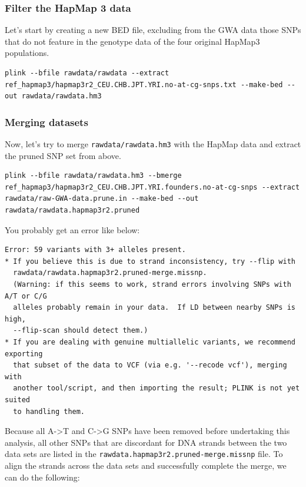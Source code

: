\documentclass[
]{book}
\newcommand{\passthrough}[1]{#1}
\begin{document}
\hypertarget{filter-the-hapmap-3-data}{%
\subsubsection{Filter the HapMap 3 data}\label{filter-the-hapmap-3-data}}

Let's start by creating a new BED file, excluding from the GWA data those SNPs that do not feature in the genotype data of the four original HapMap3 populations.

\begin{lstlisting}
plink --bfile rawdata/rawdata --extract ref_hapmap3/hapmap3r2_CEU.CHB.JPT.YRI.no-at-cg-snps.txt --make-bed --out rawdata/rawdata.hm3
\end{lstlisting}

\hypertarget{merging-datasets}{%
\subsubsection{Merging datasets}\label{merging-datasets}}

Now, let's try to merge \passthrough{\lstinline!rawdata/rawdata.hm3!} with the HapMap data and extract the pruned SNP set from above.

\begin{lstlisting}
plink --bfile rawdata/rawdata.hm3 --bmerge ref_hapmap3/hapmap3r2_CEU.CHB.JPT.YRI.founders.no-at-cg-snps --extract rawdata/raw-GWA-data.prune.in --make-bed --out rawdata/rawdata.hapmap3r2.pruned
\end{lstlisting}

You probably get an error like below:

\begin{lstlisting}
Error: 59 variants with 3+ alleles present.
* If you believe this is due to strand inconsistency, try --flip with
  rawdata/rawdata.hapmap3r2.pruned-merge.missnp.
  (Warning: if this seems to work, strand errors involving SNPs with A/T or C/G
  alleles probably remain in your data.  If LD between nearby SNPs is high,
  --flip-scan should detect them.)
* If you are dealing with genuine multiallelic variants, we recommend exporting
  that subset of the data to VCF (via e.g. '--recode vcf'), merging with
  another tool/script, and then importing the result; PLINK is not yet suited
  to handling them.
\end{lstlisting}

Because all A-\textgreater T and C-\textgreater G SNPs have been removed before undertaking this analysis, all other SNPs that are discordant for DNA strands between the two data sets are listed in the \passthrough{\lstinline!rawdata.hapmap3r2.pruned-merge.missnp!} file. To align the strands across the data sets and successfully complete the merge, we can do the following:
\end{document}
